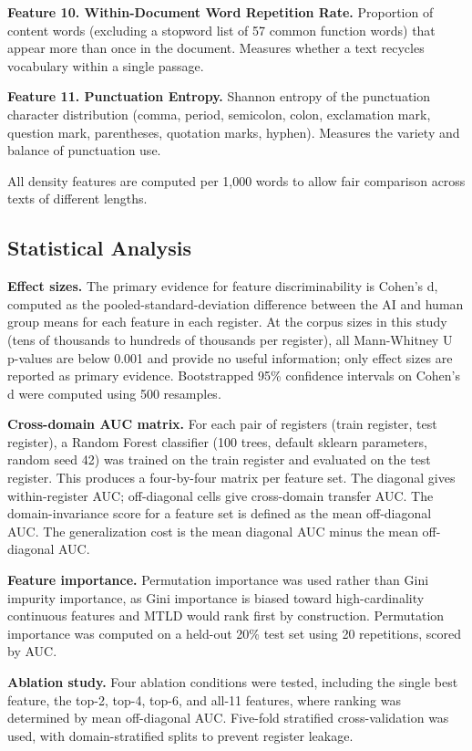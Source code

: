 \documentclass{article}
\begin{document}
\textbf{Feature 10. Within-Document Word Repetition Rate.} Proportion of content words (excluding a stopword list of 57 common function words) that appear more than once in the document. Measures whether a text recycles vocabulary within a single passage.

\textbf{Feature 11. Punctuation Entropy.} Shannon entropy of the punctuation character distribution (comma, period, semicolon, colon, exclamation mark, question mark, parentheses, quotation marks, hyphen). Measures the variety and balance of punctuation use.

All density features are computed per 1,000 words to allow fair comparison across texts of different lengths.

\subsection{Statistical Analysis}

\textbf{Effect sizes.} The primary evidence for feature discriminability is Cohen's d, computed as the pooled-standard-deviation difference between the AI and human group means for each feature in each register. At the corpus sizes in this study (tens of thousands to hundreds of thousands per register), all Mann-Whitney U p-values are below 0.001 and provide no useful information; only effect sizes are reported as primary evidence. Bootstrapped 95\% confidence intervals on Cohen's d were computed using 500 resamples.

\textbf{Cross-domain AUC matrix.} For each pair of registers (train register, test register), a Random Forest classifier (100 trees, default sklearn parameters, random seed 42) was trained on the train register and evaluated on the test register. This produces a four-by-four matrix per feature set. The diagonal gives within-register AUC; off-diagonal cells give cross-domain transfer AUC. The domain-invariance score for a feature set is defined as the mean off-diagonal AUC. The generalization cost is the mean diagonal AUC minus the mean off-diagonal AUC.

\textbf{Feature importance.} Permutation importance was used rather than Gini impurity importance, as Gini importance is biased toward high-cardinality continuous features \cite{ref20} and MTLD would rank first by construction. Permutation importance was computed on a held-out 20\% test set using 20 repetitions, scored by AUC.

\textbf{Ablation study.} Four ablation conditions were tested, including the single best feature, the top-2, top-4, top-6, and all-11 features, where ranking was determined by mean off-diagonal AUC. Five-fold stratified cross-validation was used, with domain-stratified splits to prevent register leakage.
\end{document}

